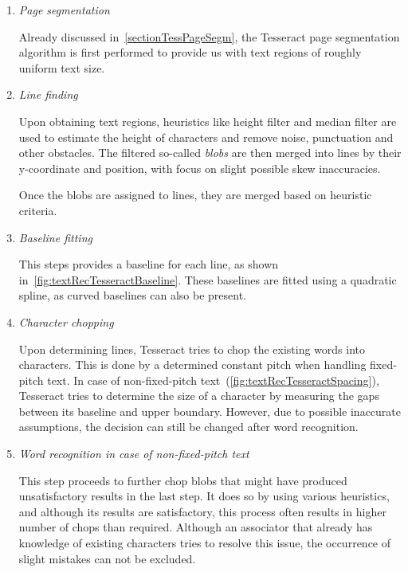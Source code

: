 \begin{enumerate}
    \item \emph{Page segmentation}
    
    Already discussed in~\cref{sectionTessPageSegm}, the Tesseract page segmentation algorithm is first performed to provide us with text regions of roughly uniform text size.
    
    \item \emph{Line finding}
     
     Upon obtaining text regions, heuristics like height filter and median filter are used to estimate the height of characters and remove noise, punctuation and other obstacles. The filtered so-called \emph{blobs} are then merged into lines by their y-coordinate and position, with focus on slight possible skew inaccuracies.
     
     Once the blobs are assigned to lines, they are merged based on heuristic criteria.
     
     \item \emph{Baseline fitting}
    
    This steps provides a baseline for each line, as shown in~\cref{fig:textRecTesseractBaseline}. These baselines are fitted using a quadratic spline, as curved baselines can also be present.
    
    \item \emph{Character chopping}
    
    Upon determining lines, Tesseract tries to chop the existing words into characters. This is done by a determined constant pitch when handling fixed-pitch text. In case of non-fixed-pitch text~(\cref{fig:textRecTesseractSpacing}), Tesseract tries to determine the size of a character by measuring the gaps between its baseline and upper boundary. However, due to possible inaccurate assumptions, the decision can still be changed after word recognition.
    
    \item \emph{Word recognition in case of non-fixed-pitch text}
    
    This step proceeds to further chop blobs that might have produced unsatisfactory results in the last step. It does so by using various heuristics, and although its results are satisfactory, this process often results in higher number of chops than required. Although an associator that already has knowledge of existing characters tries to resolve this issue, the occurrence of slight mistakes can not be excluded.
    

\end{enumerate}
